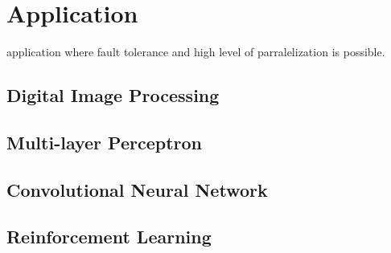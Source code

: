 %
\chapter{Application}
\label{sec:app}


application where fault tolerance and high level of parralelization is possible. 

\section{Digital Image Processing}
\label{sec:app:sec1}






\section{Multi-layer Perceptron}
\label{sec:app:sec2}



\section{Convolutional Neural Network}
\label{sec:app:sec3}



\section{Reinforcement Learning}
\label{sec:app:sec4}


